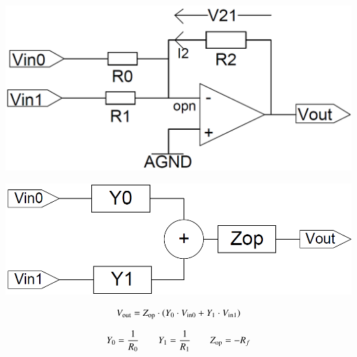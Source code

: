
\begin{minipage}[c]{0.4\columnwidth}
    \includegraphics[width=\columnwidth]{images/summierender_verstaerker.png}
\end{minipage}
\hfill
\begin{minipage}[c]{0.58\columnwidth}
    \begin{center}
        \includegraphics[width=0.8\columnwidth]{images/summierender_verstaerker_sfd.png}
    \end{center}
    $$ V_{\rm out} = Z_{\rm op} \cdot (Y_0 \cdot V_{\rm in0} + Y_1 \cdot V_{\rm in1}) $$
\end{minipage}

$$ Y_0 = \frac{1}{R_0} \qquad Y_1 = \frac{1}{R_1} \qquad Z_{\rm op} = - R_f $$



